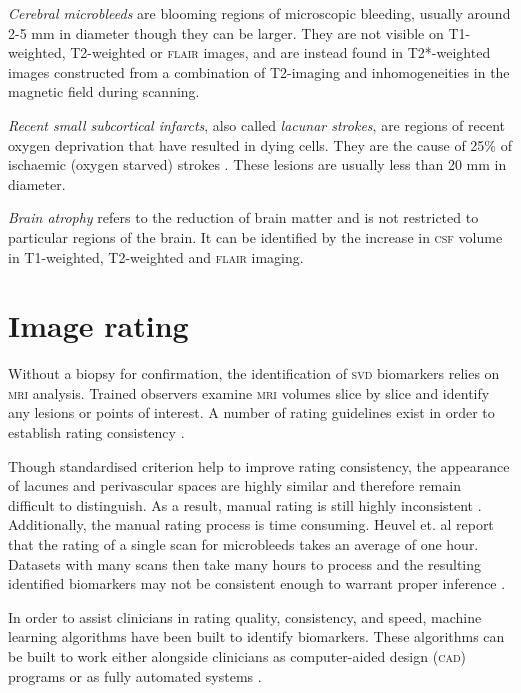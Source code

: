 \textit{Cerebral microbleeds} are blooming regions of microscopic bleeding, usually around 2-5 mm in diameter though they can be larger. They are not visible on T1-weighted, T2-weighted or \textsc{flair} images, and are instead found in T2*-weighted images constructed from a combination of T2-imaging and inhomogeneities in the magnetic field during scanning. 

\textit{Recent small subcortical infarcts}, also called \textit{lacunar strokes}, are regions of recent oxygen deprivation that have resulted in dying cells. They are the cause of 25\% of ischaemic (oxygen starved) strokes \cite{WardlawJ.M.2013Nsfr}. These lesions are usually less than 20 mm in diameter. 

\textit{Brain atrophy} refers to the reduction of brain matter and is not restricted to particular regions of the brain. It can be identified by the increase in \textsc{csf} volume in T1-weighted, T2-weighted and \textsc{flair} imaging.

\section{Image rating}\label{svd-rating}

Without a biopsy for confirmation, the identification of \textsc{svd} biomarkers relies on \textsc{mri} analysis. Trained observers examine \textsc{mri} volumes slice by slice and identify any lesions or points of interest. A number of rating guidelines exist in order to establish rating consistency \cite{AdamsH.H.Hieab2013RMfD, PotterGillian2015CPSV, WardlawJ.M.2013Nsfr}.

Though standardised criterion help to improve rating consistency, the appearance of lacunes and perivascular spaces are highly similar and therefore remain difficult to distinguish. As a result, manual rating is still highly inconsistent \cite{PotterGillian2015CPSV}. Additionally, the manual rating process is time consuming. Heuvel et. al \cite{Heuvel2016} report that the rating of a single scan for microbleeds takes an average of one hour. Datasets with many scans then take many hours to process and the resulting identified biomarkers may not be consistent enough to warrant proper inference \cite{BenjaminJ.Philip2018LIbN, WardlawJ.M.2013Nsfr}.

In order to assist clinicians in rating quality, consistency, and speed, machine learning algorithms have been built to identify biomarkers. These algorithms can be built to work either alongside clinicians as computer-aided design (\textsc{cad}) programs \cite{Heuvel2016, Uchiyama20071554, Yokoyama2007} or as fully automated systems \cite{DouQ.2016ADoC, GhafoorianM.2017Dml3}.

